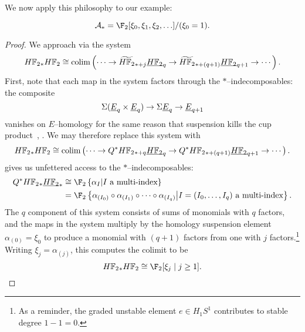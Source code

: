 We now apply this philosophy to our example:
\begin{corollary}\label{StarIndecompsInUDualSteenrodAlg}
\[\mathcal A_* = \F_2[\xi_0, \xi_1, \xi_2, \ldots]/(\xi_0 = 1).\]
\end{corollary}
\begin{proof}
We approach via the system \[\HFtwo_* \HFtwo \cong \colim\left( \cdots \to \widetilde{\HFtwo}_{*+j} \OS{\HFtwo}{q} \to \widetilde{\HFtwo}_{*+(q+1)} \OS{\HFtwo}{q+1} \to \cdots \right).\]  First, note that each map in the system factors through the \(\ast\)--indecomposables: the composite \[\Susp(\OS{E}{q} \times \OS{E}{q}) \to \Susp \OS{E}{q} \to \OS{E}{q+1}\] vanishes on \(E\)--homology for the same reason that suspension kills the cup product~\cite[Corollary 2.18]{BJW}, \cite[Proposition 13.65]{Switzer}.  We may therefore replace this system with \[\HFtwo_* \HFtwo \cong \colim\left( \cdots \to Q^* \HFtwo_{*+q} \OS{\HFtwo}{q} \to Q^* \HFtwo_{*+(q+1)} \OS{\HFtwo}{q+1} \to \cdots \right).\]   gives us unfettered access to the \(\ast\)--indecomposables:
\begin{align*}
Q^\ast \HFtwo_* \OS{\HFtwo}{*} & \cong \F_2\left\{\alpha_{I} \middle| \text{\(I\) a multi-index}\right\} \\
& = \F_2\left\{ \alpha_{(I_0)} \circ \alpha_{(I_1)} \circ \cdots \circ \alpha_{(I_q)} \middle| \text{\(I = (I_0, \ldots, I_q)\) a multi-index}\right\}.
\end{align*}
The \(q\){\th} component of this system consists of sums of monomials with \(q\) factors, and the maps in the system multiply by the homology suspension element \(\alpha_{(0)} = \xi_0\) to produce a monomial with \((q+1)\) factors from one with \(j\) factors.\footnote{As a reminder, the graded unstable element \(e \in H_1 S^1\) contributes to stable degree \(1 - 1 = 0\).}  Writing \(\xi_j = \alpha_{(j)}\), this computes the colimit to be \[\HFtwo_* \HFtwo \cong \F_2[\xi_j \mid j \ge 1]. \qedhere\]
\end{proof}

